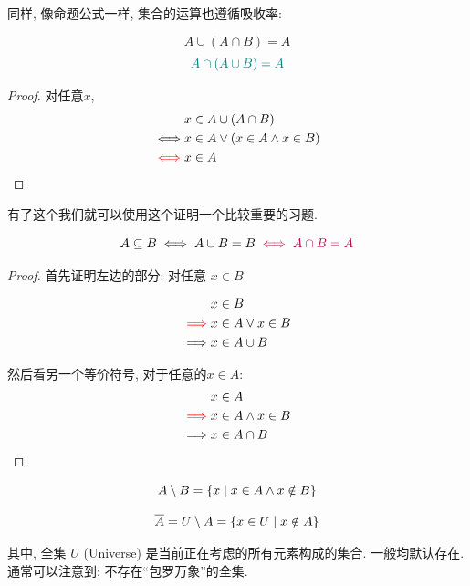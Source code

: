 同样, 像命题公式一样, 集合的运算也遵循吸收率: 

\begin{theorem}
    \[
      A \cup (A \cap B) = A
    \]
    \[
      \textcolor{teal}{A \cap (A \cup B) = A}
    \]
\end{theorem}

\begin{proof}
    对任意$x$,
    \begin{align*}
        &x \in A \cup (A \cap B) \\
        \iff & x \in A \lor (x \in A \land x \in B) \\
        \textcolor{red}{\iff} & x \in A
      \end{align*}
\end{proof}

有了这个我们就可以使用这个证明一个比较重要的习题. 

\begin{theorem}
    \[
      A \subseteq B \iff A \cup B = B \;\textcolor{purple}{\iff A \cap B = A}
    \]
  \end{theorem}
\begin{proof}
   
  首先证明左边的部分: 
  对任意 $x\in B$
    
  \setcounter{equation}{0}
  \begin{align*}
    &x \in B \\
    \textcolor{red}{\implies} &x \in A \lor x \in B \\
    \implies &x \in A \cup B
  \end{align*}
  
  然后看另一个等价符号, 对于任意的$x\in A$:
  \begin{align*}
    &x \in A \\
    \textcolor{red}{\implies} &x \in A \land x \in B \\
    \implies &x \in A \cap B
  \end{align*}
  
  
  
\end{proof}

\begin{definition}
  \[
    A \setminus B = \{x \mid x \in A \land x \notin B\}
  \]
\end{definition}

\begin{definition}
  \[
    \overline{A} = U \setminus A = \{x \in U \mid x \notin A\}
  \]

  其中, 全集 $U$ (Universe) 是当前正在考虑的所有元素构成的集合. 一般均默认存在. 通常可以注意到: 不存在``包罗万象''的全集. 
\end{definition}


